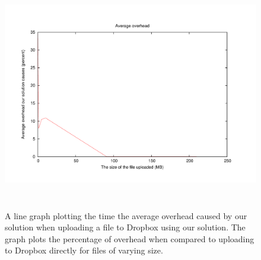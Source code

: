 \documentclass[12pt, titlepage]{article}
\begin{document}
\begin{figure}[H]
\centerline{\includegraphics[height=4.0in,width=7in,angle=0]{plots/uploadOverhead/uploadOverhead.pdf}}
\caption{A line graph plotting the time the average overhead caused by our solution when uploading a file to Dropbox using our solution. The graph plots the percentage of overhead when compared to uploading to Dropbox directly for files of varying size.}
\label{fig:uploadOverheadLineGraph}
\end{figure}
\end{document}

